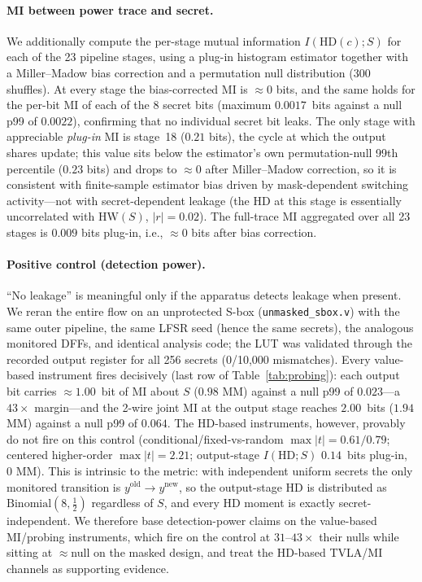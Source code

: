 \documentclass[lettersize,journal]{IEEEtran}
\begin{document}
\paragraph{MI between power trace and secret.}
We additionally compute the per-stage mutual information
$I(\mathrm{HD}(c); S)$ for each of the 23 pipeline stages, using a
plug-in histogram estimator together with a Miller--Madow bias
correction and a permutation null distribution (300 shuffles).  At
every stage the bias-corrected MI is $\approx 0$ bits, and the same
holds for the per-bit MI of each of the 8 secret bits (maximum
$0.0017$~bits against a null p99 of $0.0022$),
confirming that no individual secret bit leaks.  The only stage with
appreciable \emph{plug-in} MI is stage~18 ($0.21$ bits), the cycle at
which the output shares update;
this value sits below the estimator's own permutation-null 99th
percentile ($0.23$ bits) and drops to $\approx 0$ after
Miller--Madow correction, so it is consistent with finite-sample
estimator bias driven by mask-dependent switching activity---not with
secret-dependent leakage (the HD at this stage is essentially
uncorrelated with $\mathrm{HW}(S)$,
$|r| = 0.02$).  The full-trace MI aggregated over all 23 stages is
$0.009$ bits plug-in, i.e.,
$\approx 0$ bits after bias correction.

\paragraph{Positive control (detection power).}
``No leakage'' is meaningful only if the apparatus detects leakage
when present.  We reran the entire flow on an unprotected S-box
(\texttt{unmasked\_sbox.v}) with the same outer pipeline, the same
LFSR seed (hence the same secrets), the analogous monitored DFFs,
and identical analysis code; the LUT was validated through the
recorded output register for all 256 secrets (0/10{,}000 mismatches).
Every value-based instrument fires decisively (last row of
Table~\ref{tab:probing}): each output bit
carries $\approx 1.00$~bit of MI about $S$ ($0.98$ MM) against a
null p99 of $0.023$---a $43\times$ margin---and the 2-wire joint MI
at the output stage reaches $2.00$~bits ($1.94$ MM) against a null
p99 of $0.064$.
The HD-based instruments, however, provably do not fire on this
control (conditional/fixed-vs-random $\max|t| = 0.61/0.79$; centered
higher-order $\max|t| = 2.21$; output-stage $I(\mathrm{HD};S)$
$0.14$~bits plug-in, $0$ MM).  This is intrinsic to the metric: with
independent uniform secrets the only monitored transition is
$y^{\mathrm{old}}{\to}y^{\mathrm{new}}$, so the output-stage HD is
distributed as $\mathrm{Binomial}(8,\tfrac{1}{2})$ regardless of $S$,
and every HD moment is exactly secret-independent.
We therefore base detection-power claims on the value-based
MI/probing instruments, which fire on the control at
$31$--$43\times$ their nulls while sitting at $\approx$null on the
masked design, and treat the HD-based TVLA/MI channels as supporting
evidence.
\end{document}
